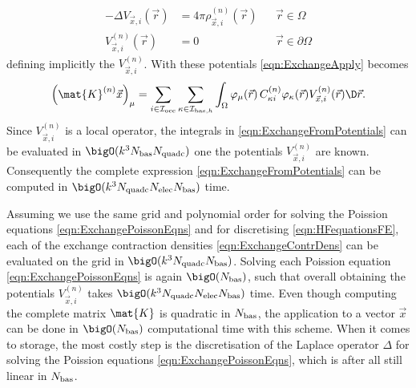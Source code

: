 \begin{equation}
\label{eqn:ExchangePoissonEqns}
\begin{aligned}
	- \Delta V_{\vec{x}, i}(\vec{r}) &= 4 \pi \rho_{\vec{x},i}^{(n)}(\vec{r})
		&& \vec{r} \in \Omega \\
	V^{(n)}_{\vec{x}, i}(\vec{r}) &= 0 && \vec{r} \in \partial\Omega
\end{aligned}
\end{equation}
defining implicitly the  $V^{(n)}_{\vec{x}, i}$.
With these potentials \eqref{eqn:ExchangeApply} becomes
\begin{equation}
	\left( \mat{K}^{(n)} \vec{x}  \right)_\mu
	= \sum_{i\in\Iocc} \sum_{\kappa\in\Ibash}
		\int_\Omega
		\varphi_\mu(\vec{r}) \, C^{(n)}_{\kappa i} \varphi_\kappa(\vec{r})
		V^{(n)}_{\vec{x}, i}(\vec{r}) \D \vec{r}.
	\label{eqn:ExchangeFromPotentials}
\end{equation}
Since $V^{(n)}_{\vec{x}, i}$ is a local operator,
the integrals in \eqref{eqn:ExchangeFromPotentials}
can be evaluated in $\bigO(k^3 \Nbas \Nquadc)$
one the potentials $V^{(n)}_{\vec{x}, i}$ are known.
Consequently the complete expression \eqref{eqn:ExchangeFromPotentials}
can be computed in $\bigO(k^3 \Nquadc \Nelec \Nbas)$ time.

Assuming we use the same grid and polynomial order
for solving the Poission equations \eqref{eqn:ExchangePoissonEqns}
and for discretising \eqref{eqn:HFequationsFE},
each of the exchange contraction densities
\eqref{eqn:ExchangeContrDens}
can be evaluated on the grid in $\bigO(k^3 \Nquadc \Nbas)$.
Solving each Poission equation \eqref{eqn:ExchangePoissonEqns}
is again $\bigO(\Nbas)$,
such that overall obtaining the potentials $V^{(n)}_{\vec{x}, i}$
takes $\bigO(k^3 \Nquadc \Nelec \Nbas)$ time.
Even though computing the complete matrix $\mat{K}$ is quadratic
in $N_\text{bas}$,
the application to a vector $\vec{x}$
can be done in $\bigO(\Nbas)$ computational time
with this scheme.
When it comes to storage,
the most costly step is the discretisation
of the Laplace operator $\Delta$ for solving the Poission equations
\eqref{eqn:ExchangePoissonEqns},
which is after all still linear in $N_\text{bas}$.

